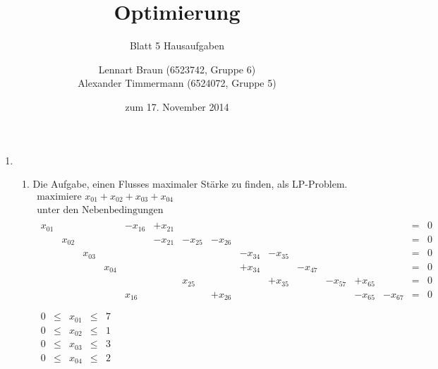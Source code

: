 \documentclass[a4paper]{scrartcl}
\title{Optimierung}
\subtitle{Blatt 5 Hausaufgaben}
\author{
	Lennart Braun (6523742, Gruppe 6) \\
    Alexander Timmermann (6524072, Gruppe 5)
}
\date{zum 17. November 2014}
\begin{document}
\maketitle

\begin{enumerate}[label=\bfseries\arabic*.]
    \item %
        \begin{enumerate}
            \item Die Aufgabe, einen Flusses maximaler Stärke zu finden, als
                LP-Problem.
                \begin{equation}
                    \begin{gathered}
                        \text{maximiere } x_{01} +x_{02} +x_{03} +x_{04} \\
                        \text{unter den Nebenbedingungen} \\
                        \begin{array}{rrrrrrrrrrrrrrcr}
                            x_{01} &  &  &  & -x_{16} & +x_{21} &  &  &  &  &  &  &  &  & = & 0 \\
                            & x_{02} &  &  &  & -x_{21} & -x_{25} & -x_{26} &  &  &  &  &  &  & = & 0 \\
                            &  & x_{03} &  &  &  &  &  & -x_{34} & -x_{35} &  &  &  &  & = & 0 \\
                            &  &  & x_{04} &  &  &  &  & +x_{34} &  & -x_{47} &  &  &  & = & 0 \\
                            &  &  &  &  &  & x_{25} &  &  & +x_{35} &  & -x_{57} & +x_{65} &  & = & 0 \\
                            &  &  &  & x_{16} &  &  & +x_{26} &  &  &  &  & -x_{65} & -x_{67} & = & 0 \\
                        \end{array} \\
                        \begin{array}{rcrcr}
                            0 & \leq & x_{01} & \leq & 7 \\
                            0 & \leq & x_{02} & \leq & 1 \\
                            0 & \leq & x_{03} & \leq & 3 \\
                            0 & \leq & x_{04} & \leq & 2 \\

\end{array}
\end{gathered}
\end{equation}
\end{enumerate}
\end{enumerate}
\end{document}
